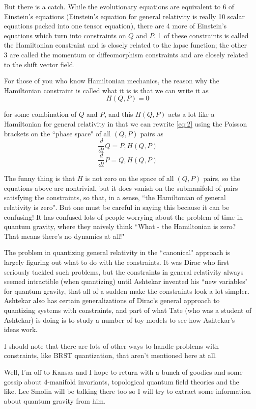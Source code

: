 But there is a catch. While the evolutionary equations are equivalent to 6 of Einstein's equations (Einstein's equation for general relativity is really 10 scalar equations packed into one tensor equation), there are 4 more of Einstein's equations which turn into constraints on $Q$ and $P$. 1 of these constraints is called the Hamiltonian constraint and is closely related to the lapse function; the other 3 are called the momentum or diffeomorphism constraints and are closely related to the shift vector field.

For those of you who know Hamiltonian mechanics, the reason why the Hamiltonian constraint is called what it is is that we can write it as
\[H(Q,P) = 0\]

for some combination of $Q$ and $P$, and this $H(Q,P)$ acts a lot like a Hamiltonian for general relativity in that we can rewrite \ref{eq:2} using the Poisson brackets on the ``phase space" of all $(Q,P)$ pairs as
\[\frac{d}{dt}Q = {P,H(Q,P)}\]
\[\frac{d}{dt}P = {Q,H(Q,P)}\]

The funny thing is that $H$ is not zero on the space of all $(Q,P)$ pairs, so the equations above are nontrivial, but it does vanish on the submanifold of pairs satisfying the constraints, so that, in a sense, ``the Hamiltonian of general relativity is zero". But one must be careful in saying this because it can be confusing! It has confused lots of people worrying about the problem of time in quantum gravity, where they naively think ``What - the Hamiltonian is zero? That means there's no dynamics at all!"

The problem in quantizing general relativity in the ``canonical" approach is largely figuring out what to do with the constraints. It was Dirac who first seriously tackled such problems, but the constraints in general relativity always seemed intractible (when quantizing) until Ashtekar invented his ``new variables" for quantum gravity, that all of a sudden make the constraints look a lot simpler. Ashtekar also has certain generalizations of Dirac's general approach to quantizing systems with constraints, and part of what Tate (who was a student of Ashtekar) is doing is to study a number of toy models to see how Ashtekar's ideas work.

I should note that there are lots of other ways to handle problems with constraints, like BRST quantization, that aren't mentioned here at all.

Well, I'm off to Kansas and I hope to return with a bunch of goodies and some gossip about 4-manifold invariants, topological quantum field theories and the like. Lee Smolin will be talking there too so I will try to extract some information about quantum gravity from him. 

